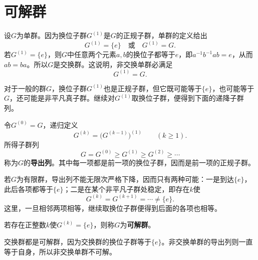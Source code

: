 \section{可解群}

设$G$为单群。因为换位子群$G^{(1)}$是$G$的正规子群，单群的定义给出
\[
G^{(1)}=\{e\}\quad\text{或}\quad G^{(1)}=G.
\]
若$G^{(1)}=\{e\}$，则$G$中任意两个元素$a,b$的换位子都等于$e$，即$a^{-1}b^{-1}ab=e$，从而$ab=ba$。所以$G$是交换群。这说明，非交换单群必满足
\[
G^{(1)}=G.
\]

对于一般的群$G$，换位子群$G^{(1)}$也是正规子群，但它既可能等于$\{e\}$，也可能等于$G$，还可能是非平凡真子群。继续对$G^{(1)}$取换位子群，便得到下面的递降子群列。

\begin{definition}
令$G^{(0)}=G$，递归定义
\[
G^{(k)}=\bigl(G^{(k-1)}\bigr)^{(1)}\qquad(k\geq1).
\]
所得子群列
\[
G=G^{(0)}\geq G^{(1)}\geq G^{(2)}\geq\cdots
\]
称为$G$的\textbf{导出列}。其中每一项都是前一项的换位子群，因而是前一项的正规子群。
\end{definition}

若$G$为有限群，导出列不能无限次严格下降，因而只有两种可能：一是到达$\{e\}$，此后各项都等于$\{e\}$；二是在某个非平凡子群处稳定，即存在$k$使
\[
G^{(k)}=G^{(k+1)}=\cdots\ne\{e\}.
\]
这里，一旦相邻两项相等，继续取换位子群便得到后面的各项也相等。

\begin{definition}
若存在正整数$k$使$G^{(k)}=\{e\}$，则称$G$为\textbf{可解群}。
\end{definition}

交换群都是可解群，因为交换群的换位子群等于$\{e\}$。非交换单群的导出列则一直等于自身，所以非交换单群不可解。

